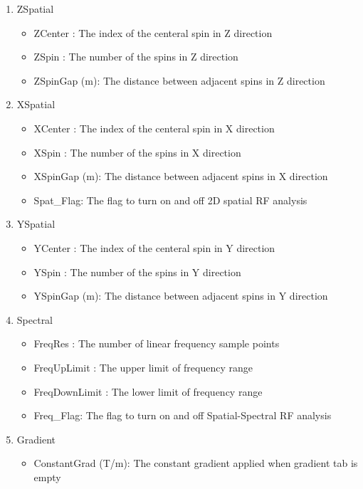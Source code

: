 \documentclass{book}%
\begin{document}
\begin{enumerate}
\begin{enumerate}
\item ZSpatial \label{it:ZSpatial}
\begin{itemize}
	\item ZCenter : The index of the centeral spin in Z direction
	\item ZSpin : The number of the spins in Z direction
	\item ZSpinGap (m): The distance between adjacent spins in Z direction
\end{itemize}

\item XSpatial \label{it:XSpatial}

\begin{itemize}
	\item XCenter : The index of the centeral spin in X direction
	\item XSpin : The number of the spins in X direction
	\item XSpinGap (m): The distance between adjacent spins in X direction
	\item Spat\_Flag: The flag to turn on and off 2D spatial RF analysis
\end{itemize}

\item YSpatial \label{it:YSpatial}

\begin{itemize}
	\item YCenter : The index of the centeral spin in Y direction
	\item YSpin : The number of the spins in Y direction
	\item YSpinGap (m): The distance between adjacent spins in Y direction
\end{itemize}

\item Spectral \label{it:Spectral}

\begin{itemize}
	\item FreqRes : The number of linear frequency sample points
	\item FreqUpLimit : The upper limit of frequency range
	\item FreqDownLimit : The lower limit of frequency range
	\item Freq\_Flag: The flag to turn on and off Spatial-Spectral RF analysis
\end{itemize}

\item Gradient

\begin{itemize}
	\item ConstantGrad (T/m): The constant gradient applied when gradient tab is empty
\end{itemize}


\end{enumerate}
\end{enumerate}
\end{document}
